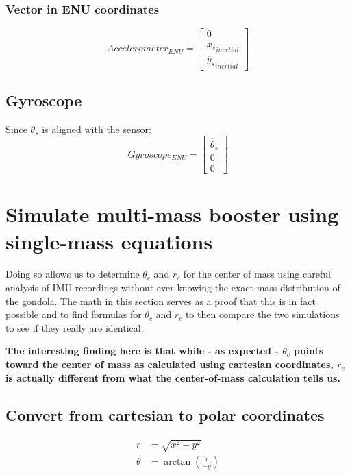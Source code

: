 \documentclass[titlepage]{article}
\numberwithin{equation}{section}
\begin{document}
\subsubsection{Vector in ENU coordinates}
\begin{equation}
Accelerometer_{ENU} = \left[ \begin{array}{c}
0 \\
\ddot{x_s}_{inertial} \\
\ddot{y_s}_{inertial}
\end{array} \right]
\end{equation}

\subsection{Gyroscope}
Since $\theta_s$ is aligned with the sensor:
\begin{equation}
Gyroscope_{ENU} = \left[ \begin{array}{c}
\dot{\theta_s} \\
0 \\
0
\end{array} \right]
\end{equation}

\section{Simulate multi-mass booster using single-mass equations}
Doing so allows us to determine $\theta_c$ and $r_c$ for the center of mass using careful analysis of IMU recordings without ever knowing the exact mass distribution of the gondola.
The math in this section serves as a proof that this is in fact possible and to find formulas for $\theta_c$ and $r_c$ to then compare the two simulations to see if they really are identical.

\bigskip
\noindent
\textbf{The interesting finding here is that while - as expected - $\theta_c$ points toward the center of mass as calculated using cartesian coordinates, $r_c$ is actually different from what the center-of-mass calculation tells us.}

\subsection{Convert from cartesian to polar coordinates}
\begin{align}
r &= \sqrt{x^2 + y^2} \\
\theta &= \arctan{\left(\frac{x}{-y}\right)}
\end{align}
\end{document}

